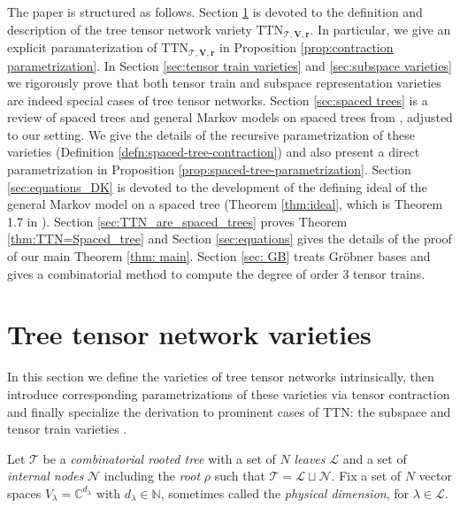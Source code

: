 \documentclass[12pt]{article}
\theoremstyle{definition}
\numberwithin{theorem}{section}
\newcommand{\CC}{\mathbb{C}}
\newcommand{\NN}{\mathbb{N}}
\begin{document}
The paper is structured as follows. Section \ref{sec:TTN} is devoted to the definition and description of the tree tensor network variety $\mathrm{TTN}_{\mathscr{T}, \mathbf{V}, \mathbf{r}}$. In particular, we give an explicit paramaterization of 
$\mathrm{TTN}_{\mathscr{T}, \mathbf{V}, \mathbf{r}}$ in 
Proposition \ref{prop:contraction parametrization}. In Section \ref{sec:tensor train varieties} and \ref{sec:subspace varieties} we rigorously prove that both tensor train and subspace representation varieties are indeed special cases of tree tensor networks. Section \ref{sec:spaced trees} is a review of spaced trees and general Markov models on spaced trees from \cite{DK09}, adjusted to our setting. We give the details of the recursive parametrization of these varieties (Definition \ref{defn:spaced-tree-contraction}) and also present a direct parametrization in Proposition \ref{prop:spaced-tree-parametrization}. Section \ref{sec:equations_DK} is devoted to the development of the defining ideal of the general Markov model on a spaced tree (Theorem \ref{thm:ideal}, which is Theorem 1.7 in \cite{DK09}). 
Section \ref{sec:TTN_are_spaced_trees} proves Theorem \ref{thm:TTN=Spaced_tree} and Section \ref{sec:equations} gives the details of the proof of our main Theorem \ref{thm: main}. Section \ref{sec: GB} treats   Gr\"obner bases and gives
 a combinatorial method to compute the degree of order $3$ tensor trains. 

\section{Tree tensor network varieties}\label{sec:TTN}
In this section we define the varieties of tree tensor networks intrinsically, then introduce corresponding parametrizations of these varieties via tensor contraction and finally specialize the derivation to prominent cases of TTN: the subspace \cite{Breiding_2024, Landsberg2012} and tensor train varieties \cite{BFHP25,Oseledets_2011}.

Let $\mathscr T$ be a \emph{combinatorial  rooted tree} with a set of $N$  \emph{leaves} $\mathscr L$ and a set of \emph{internal nodes} $\mathscr N$ including the \emph{root} $\rho$ such that $\mathscr{T} = \mathscr{L} \sqcup \mathscr{N}$.
Fix a set of $N$ vector spaces $V_\lambda = \CC^{d_\lambda}$ with $d_\lambda \in \NN$, sometimes called the \emph{physical dimension}, for $\lambda \in \mathscr L$. 
\end{document}
